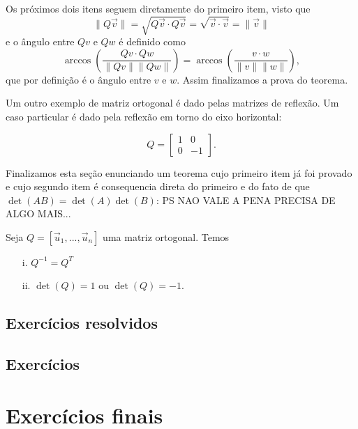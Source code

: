 \documentclass[../livro.tex]{subfiles}  %
\begin{document}
 
 Os próximos dois itens seguem diretamente do primeiro item, visto que 
\begin{equation}\| Q \vec{v} \| = \sqrt{Q\vec{v} \cdot Q\vec{v}} = \sqrt{\vec{v} \cdot \vec{v}} =  \| \vec{v} \| \end{equation} 
e 
o ângulo entre $Qv$ e $Qw$ é definido como 
\begin{equation}
\arccos\left(\frac{Qv \cdot Qw	}{\|Qv\| \|Qw\|} \right)
=\arccos\left(\frac{v \cdot w	}{\|v\| \|w\|} \right),\end{equation} 
que por definição é o ângulo  entre $v$ e $w$. 
Assim finalizamos a prova do teorema. 
 
 \medskip
 
 
 Um outro exemplo de matriz ortogonal é dado pelas matrizes de reflexão. Um caso particular é dado pela reflexão em torno do eixo horizontal: 
 
 \begin{equation}
 Q =
 \begin{bmatrix}
 1 & 0 \\
 0 & -1
 \end{bmatrix} .\end{equation}

Finalizamos esta seção enunciando um teorema cujo primeiro item já foi provado e cujo segundo item é consequencia direta do primeiro e do fato de que $\det(AB)=\det(A) \det (B)$:  PS NAO VALE A PENA PRECISA DE ALGO MAIS...

\begin{theorem}
	Seja $Q=[\vec{u}_1,...,\vec{u}_n]$ uma matriz ortogonal. Temos
	\begin{enumerate}
		\item[i.] $Q^{-1}=Q^T$
		\item[ii.] $\det(Q)=1$ ou $\det(Q)=-1$.
	\end{enumerate}
\end{theorem}

\subsection*{Exercícios resolvidos}

\construirExeresol

\subsection*{Exercícios}

\construirExer

\section{Exercícios finais}

\construirExer
\end{document}
